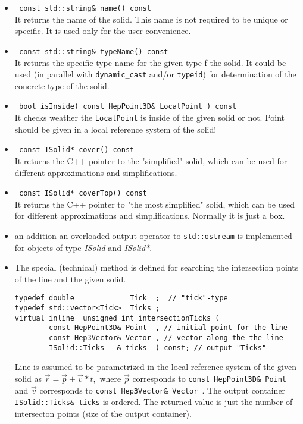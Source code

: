 \begin{itemize}
\item 
\verb+ const std::string& name() const + 
\\ It returns the name of the solid. This name is not required to be unique or specific. 
 It is used only for the user convenience.
\item 
\verb+ const std::string& typeName() const + 
\\ It returns the specific type name for the given type f the solid. It could
be used (in parallel with \verb+dynamic_cast+ and/or \verb+typeid+) for 
determination of the concrete type of the solid.
 \item 
\verb+ bool isInside( const HepPoint3D& LocalPoint ) const + 
\\ It checks weather the \verb+LocalPoint+ is inside of the given solid or not. 
Point should be given in a local reference system of the solid!
\item 
\verb+ const ISolid* cover() const + 
\\ It returns the C++ pointer to the "simplified" solid, which can be used 
for different approximations and simplifications. 
\item 
\verb+ const ISolid* coverTop() const + 
\\ It returns the C++ pointer to "the most simplified" solid, which can be used 
for different approximations and simplifications. Normally it is just a  
box. 
\item an addition an overloaded output operator to
\verb+std::ostream+ is implemented for objects of type
{\it ISolid } and {\it ISolid*}.  
\item The special (technical) method is defined for searching the intersection points
of the line and the given solid. 
\begin{verbatim} 
typedef double             Tick  ;  // "tick"-type 
typedef std::vector<Tick>  Ticks ;  
virtual inline  unsigned int intersectionTicks ( 
        const HepPoint3D& Point  , // initial point for the line 
        const Hep3Vector& Vector , // vector along the the line 
        ISolid::Ticks   & ticks  ) const; // output "Ticks"
\end{verbatim}		
Line is assumed to be parametrized in the local reference system 
of the given solid as 	
$\vec{r} = \vec{p} + \vec{v}*t,$
where $\vec{p}$ corresponds to {\tt const HepPoint3D\& Point } and 
$\vec{v}$ corresponds to {\tt const Hep3Vector\& Vector }. 
The output container {\tt ISolid::Ticks\& ticks}  is ordered. 
The returned value is just the number of intersecton points
(size of the output container).
\end{itemize}
	
